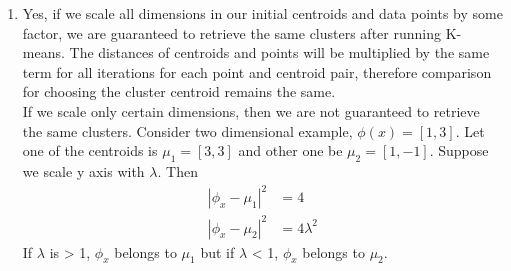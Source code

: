 \documentclass[12pt]{article}
\begin{document}
\begin{enumerate}[label=(\alph*)]
	 \item Yes, if we scale all dimensions in our initial centroids and data points by some factor, we are guaranteed to retrieve the same clusters after running K-means. The distances of centroids and points will be multiplied by the same term for all iterations for each point and centroid pair, therefore comparison for choosing the cluster centroid remains the same. \\
	 If we scale only certain dimensions, then we are not guaranteed to retrieve the same clusters. Consider two dimensional example, $\phi (x) = [1,3]$. Let one of the centroids is $\mu_1 = [3,3]$ and other one be $\mu_2 = [1,-1]$. Suppose we scale y axis with $\lambda$. Then
	 \begin{align*}
	 |\phi_x - \mu_1|^2 &= 4 \\
	 |\phi_x - \mu_2|^2 &= 4\lambda^2
	 \end{align*}
If $\lambda$ is > 1, $\phi_x$ belongs to $\mu_1$ but if $\lambda$ < 1, $\phi_x$ belongs to $\mu_2$.


\end{enumerate}

 
\end{document}
